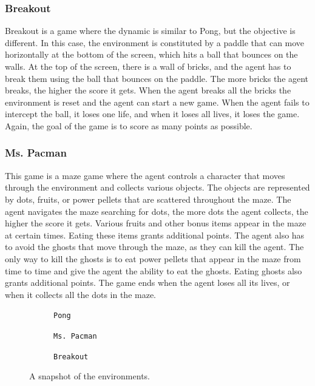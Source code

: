 \subsubsection{Breakout}
Breakout is a game where the dynamic is similar to Pong, but the objective is different.
In this case, the environment is constituted by a paddle that can move horizontally at the bottom of the screen, which hits a ball that bounces on the walls.
At the top of the screen, there is a wall of bricks, and the agent has to break them using the ball that bounces on the paddle.
The more bricks the agent breaks, the higher the score it gets.
When the agent breaks all the bricks the environment is reset and the agent can start a new game.
When the agent fails to intercept the ball, it loses one life, and when it loses all lives, it loses the game.
Again, the goal of the game is to score as many points as possible.


\subsubsection{Ms. Pacman}
This game is a maze game where the agent controls a character that moves through the environment and collects various objects.
The objects are represented by dots, fruits, or power pellets that are scattered throughout the maze.
The agent navigates the maze searching for dots, the more dots the agent collects, the higher the score it gets.
Various fruits and other bonus items appear in the maze at certain times.
Eating these items grants additional points.
The agent also has to avoid the ghosts that move through the maze, as they can kill the agent.
The only way to kill the ghosts is to eat power pellets that appear in the maze from time to time and give the agent the ability to eat the ghosts.
Eating ghosts also grants additional points.
The game ends when the agent loses all its lives, or when it collects all the dots in the maze. 
\begin{figure}[ht]
    \centering
    \begin{subfigure}[b]{0.30\textwidth}
        \centering
        \fbox{\rule[-.5cm]{0cm}{4cm} \rule[-.5cm]{4cm}{0cm}}
        \caption{\texttt{Pong}}
        \label{fig:pong_env}
    \end{subfigure}
    \hfill
    \begin{subfigure}[b]{0.30\textwidth}
        \centering
        \fbox{\rule[-.5cm]{0cm}{4cm} \rule[-.5cm]{4cm}{0cm}}
        \caption{\texttt{Ms. Pacman}}
        \label{fig:mspacman_env}
    \end{subfigure}
    \hfill
    \begin{subfigure}[b]{0.30\textwidth}
        \centering
        \fbox{\rule[-.5cm]{0cm}{4cm} \rule[-.5cm]{4cm}{0cm}}
        \caption{\texttt{Breakout}}
        \label{fig:breakout_env}
    \end{subfigure}
    \caption{A snapshot of the environments.}
    \label{fig:environemnts}
\end{figure}


